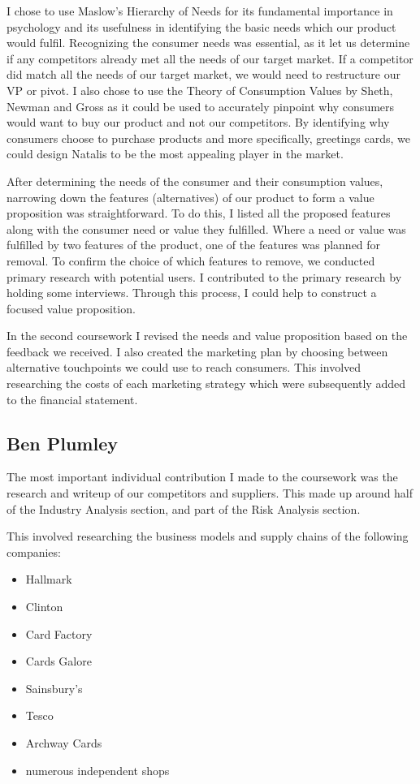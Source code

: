 \documentclass[10pt,a4paper]{article}
\begin{document}
\begin{appendices}
I chose to use Maslow's Hierarchy of Needs for its fundamental importance in psychology and its usefulness in identifying the basic needs which our product would fulfil. Recognizing the consumer needs was essential, as it let us determine if any competitors already met all the needs of our target market. If a competitor did match all the needs of our target market, we would need to restructure our VP or pivot. I also chose to use the Theory of Consumption Values by Sheth, Newman and Gross as it could be used to accurately pinpoint why consumers would want to buy our product and not our competitors. By identifying why consumers choose to purchase products and more specifically, greetings cards, we could design Natalis to be the most appealing player in the market.

After determining the needs of the consumer and their consumption values, narrowing down the features (alternatives) of our product to form a value proposition was straightforward. To do this, I listed all the proposed features along with the consumer need or value they fulfilled. Where a need or value was fulfilled by two features of the product, one of the features was planned for removal. To confirm the choice of which features to remove, we conducted primary research with potential users. I contributed to the primary research by holding some interviews. Through this process, I could help to construct a focused value proposition.

In the second coursework I revised the needs and value proposition based on the feedback we received. I also created the marketing plan by choosing between alternative touchpoints we could use to reach consumers. This involved researching the costs of each marketing strategy which were subsequently added to the financial statement.

\clearpage


\subsection{Ben Plumley}\label{subsec:benPlumley}
 The most important individual contribution I made to the coursework was the research and writeup of our competitors and suppliers. This made up around half of the Industry Analysis section, and part of the Risk Analysis section.

This involved researching the business models and supply chains of the following companies:

\begin{itemize}
	\item Hallmark
	\item Clinton
	\item Card Factory
	\item Cards Galore
	\item Sainsbury's
	\item Tesco
	\item Archway Cards
	\item numerous independent shops
\end{itemize}


\end{appendices}
\end{document}
